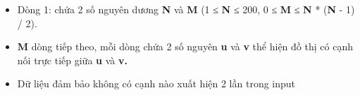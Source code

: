 \begin{itemize}
	\item Dòng 1: chứa 2 số nguyên dương \textbf{N} và \textbf{M} (1 ≤ \textbf{N} ≤ 200, 0 ≤ \textbf{M} ≤ \textbf{N} * (\textbf{N} - 1) / 2).
	\item \textbf{M} dòng tiếp theo, mỗi dòng chứa 2 số nguyên \textbf{u} và \textbf{v} thể hiện đồ thị có cạnh nối trực tiếp giữa \textbf{u} và \textbf{v}\textbf{.}
	\item Dữ liệu đảm bảo không có cạnh nào xuất hiện 2 lần trong input\textbf{
}
\end{itemize}